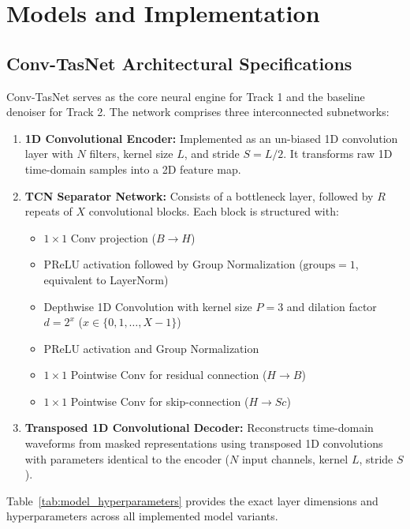 \documentclass[11pt,a4paper]{report}
\begin{document}
\chapter{Models and Implementation}
\label{chap:models_impl}

\section{Conv-TasNet Architectural Specifications}
Conv-TasNet serves as the core neural engine for Track 1 and the baseline denoiser for Track 2. The network comprises three interconnected subnetworks:
\begin{enumerate}
    \item \textbf{1D Convolutional Encoder:} Implemented as an un-biased 1D convolution layer with $N$ filters, kernel size $L$, and stride $S = L/2$. It transforms raw 1D time-domain samples into a 2D feature map.
    \item \textbf{TCN Separator Network:} Consists of a bottleneck layer, followed by $R$ repeats of $X$ convolutional blocks. Each block is structured with:
    \begin{itemize}
        \item $1\times 1$ Conv projection ($B \rightarrow H$)
        \item PReLU activation followed by Group Normalization ($\text{groups}=1$, equivalent to LayerNorm)
        \item Depthwise 1D Convolution with kernel size $P=3$ and dilation factor $d = 2^x$ ($x \in \{0, 1, \dots, X-1\}$)
        \item PReLU activation and Group Normalization
        \item $1\times 1$ Pointwise Conv for residual connection ($H \rightarrow B$)
        \item $1\times 1$ Pointwise Conv for skip-connection ($H \rightarrow Sc$)
    \end{itemize}
    \item \textbf{Transposed 1D Convolutional Decoder:} Reconstructs time-domain waveforms from masked representations using transposed 1D convolutions with parameters identical to the encoder ($N$ input channels, kernel $L$, stride $S$).
\end{enumerate}

Table~\ref{tab:model_hyperparameters} provides the exact layer dimensions and hyperparameters across all implemented model variants.
\end{document}
